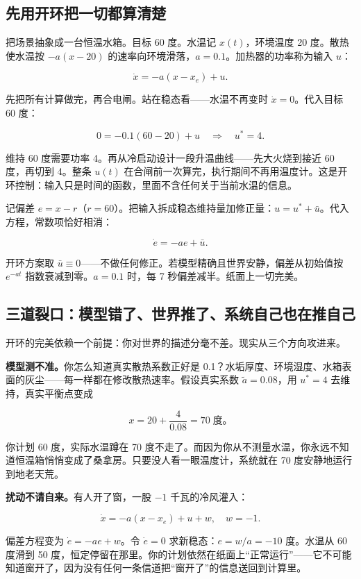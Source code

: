 \subsection{先用开环把一切都算清楚}

把场景抽象成一台恒温水箱。目标 60 度。水温记 \(x(t)\)，环境温度 20 度。散热使水温按 \(-a(x - 20)\) 的速率向环境滑落，\(a = 0.1\)。加热器的功率称为输入 \(u\)：

\[
\dot x = -a(x - x_e) + u.
\]

先把所有计算做完，再合电闸。站在稳态看——水温不再变时 \(\dot x = 0\)。代入目标 60 度：

\[
0 = -0.1(60 - 20) + u \quad\Rightarrow\quad u^* = 4.
\]

维持 60 度需要功率 4。再从冷启动设计一段升温曲线——先大火烧到接近 60 度，再切到 4。整条 \(u(t)\) 在合闸前一次算完，执行期间不再用温度计。这是开环控制：输入只是时间的函数，里面不含任何关于当前水温的信息。

记偏差 \(e = x - r\)（\(r = 60\)）。把输入拆成稳态维持量加修正量：\(u = u^* + \bar u\)。代入方程，常数项恰好相消：

\[
\dot e = -a e + \bar u.
\]

开环方案取 \(\bar u \equiv 0\)——不做任何修正。若模型精确且世界安静，偏差从初始值按 \(e^{-at}\) 指数衰减到零。\(a = 0.1\) 时，每 7 秒偏差减半。纸面上一切完美。

\subsection{三道裂口：模型错了、世界推了、系统自己也在推自己}

开环的完美依赖一个前提：你对世界的描述分毫不差。现实从三个方向攻进来。

\textbf{模型测不准。}你怎么知道真实散热系数正好是 0.1？水垢厚度、环境湿度、水箱表面的灰尘——每一样都在修改散热速率。假设真实系数 \(\tilde a = 0.08\)，用 \(u^* = 4\) 去维持，真实平衡点变成

\[
x = 20 + \frac{4}{0.08} = 70\; \text{度。}
\]

你计划 60 度，实际水温蹲在 70 度不走了。而因为你从不测量水温，你永远不知道恒温箱悄悄变成了桑拿房。只要没人看一眼温度计，系统就在 70 度安静地运行到地老天荒。

\textbf{扰动不请自来。}有人开了窗，一股 \(-1\) 千瓦的冷风灌入：

\[
\dot x = -a(x - x_e) + u + w, \quad w = -1.
\]

偏差方程变为 \(\dot e = -a e + w\)。令 \(\dot e = 0\) 求新稳态：\(e = w/a = -10\) 度。水温从 60 度滑到 50 度，恒定停留在那里。你的计划依然在纸面上``正常运行''——它不可能知道窗开了，因为没有任何一条信道把``窗开了''的信息送回到计算里。

